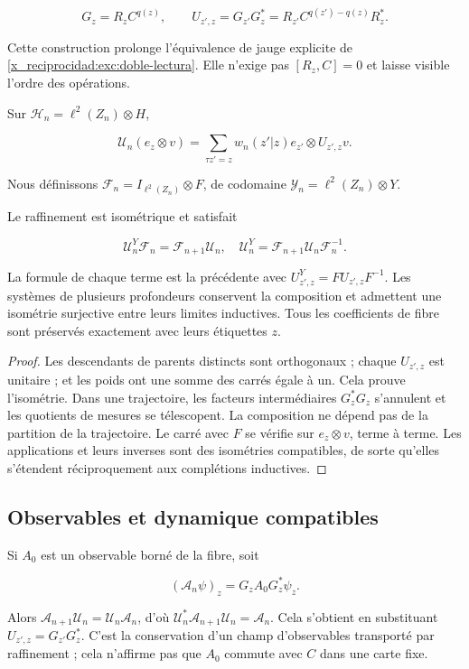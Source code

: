 \[
G_z=R_zC^{q(z)},\qquad
U_{z',z}=G_{z'}G_z^*
=R_{z'}C^{q(z')-q(z)}R_z^*.
\]

Cette construction prolonge l’équivalence de jauge explicite de \cref{x_reciprocidad:exc:doble-lectura}. Elle n’exige pas \([R_z,C]=0\) et laisse visible l’ordre des opérations.

Sur \(\mathscr H_n=\ell^2(Z_n)\otimes H\),

\[
\mathscr U_n(e_z\otimes v)
=\sum_{\tau z'=z}w_n(z'|z)e_{z'}\otimes U_{z',z}v.
\]

Nous définissons \(\mathscr F_n=I_{\ell^2(Z_n)}\otimes F\), de codomaine \(\mathscr Y_n=\ell^2(Z_n)\otimes Y\).

\begin{theorem}
Le raffinement est isométrique et satisfait

\[
\mathscr U^Y_n\mathscr F_n=\mathscr F_{n+1}\mathscr U_n,
\quad
\mathscr U^Y_n=\mathscr F_{n+1}\mathscr U_n\mathscr F_n^{-1}.
\]

La formule de chaque terme est la précédente avec \(U^Y_{z',z}=FU_{z',z}F^{-1}\). Les systèmes de plusieurs profondeurs conservent la composition et admettent une isométrie surjective entre leurs limites inductives. Tous les coefficients de fibre sont préservés exactement avec leurs étiquettes \(z\).
\end{theorem}

\begin{proof}
Les descendants de parents distincts sont orthogonaux ; chaque \(U_{z',z}\) est unitaire ; et les poids ont une somme des carrés égale à un. Cela prouve l’isométrie. Dans une trajectoire, les facteurs intermédiaires \(G_z^*G_z\) s’annulent et les quotients de mesures se télescopent. La composition ne dépend pas de la partition de la trajectoire. Le carré avec \(F\) se vérifie sur \(e_z\otimes v\), terme à terme. Les applications et leurs inverses sont des isométries compatibles, de sorte qu’elles s’étendent réciproquement aux complétions inductives.
\end{proof}

\subsection{Observables et dynamique compatibles}

Si \(A_0\) est un observable borné de la fibre, soit

\[
(\mathscr A_n\psi)_z=G_zA_0G_z^*\psi_z.
\]

Alors \(\mathscr A_{n+1}\mathscr U_n=\mathscr U_n\mathscr A_n\), d’où \(\mathscr U_n^*\mathscr A_{n+1}\mathscr U_n=\mathscr A_n\). Cela s’obtient en substituant \(U_{z',z}=G_{z'}G_z^*\). C’est la conservation d’un champ d’observables transporté par raffinement ; cela n’affirme pas que \(A_0\) commute avec \(C\) dans une carte fixe.

